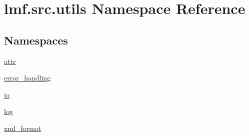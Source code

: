 \hypertarget{namespacelmf_1_1src_1_1utils}{\section{lmf.\+src.\+utils Namespace Reference}
\label{namespacelmf_1_1src_1_1utils}
}
\subsection*{Namespaces}
\begin{DoxyCompactItemize}
\item 
 \hyperlink{namespacelmf_1_1src_1_1utils_1_1attr}{attr}
\item 
 \hyperlink{namespacelmf_1_1src_1_1utils_1_1error__handling}{error\+\_\+handling}
\item 
 \hyperlink{namespacelmf_1_1src_1_1utils_1_1io}{io}
\item 
 \hyperlink{namespacelmf_1_1src_1_1utils_1_1log}{log}
\item 
 \hyperlink{namespacelmf_1_1src_1_1utils_1_1xml__format}{xml\+\_\+format}
\end{DoxyCompactItemize}
